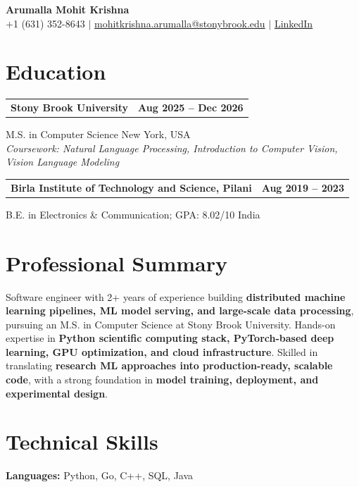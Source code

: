 \documentclass[letterpaper,10pt]{article}
\makeatletter
\newcommand{\entry}[2]{%
  \noindent
  \begin{tabularx}{\linewidth}
    {@{}>{\raggedright\arraybackslash}X@{\hspace{6pt}}r@{}}
    \textbf{#1} & #2
  \end{tabularx}\par
}
\makeatother
\begin{document}
\begin{center}
    {\LARGE\bfseries Arumalla Mohit Krishna}\\[3pt]
    +1 (631) 352-8643 $|$
    \href{mailto:mohitkrishna.arumalla@stonybrook.edu}
    {mohitkrishna.arumalla@stonybrook.edu} $|$
    \href{https://linkedin.com/in/mohit-krishna-arumalla}
    {LinkedIn}
\end{center}
\vspace{-8pt}

\section{Education}

\entry
  {Stony Brook University}
  {\textbf{Aug 2025 -- Dec 2026}}

M.S. in Computer Science \hfill New York, USA\\
\textit{
Coursework: Natural Language Processing,
Introduction to Computer Vision, Vision Language Modeling
}
\vspace{3pt}

\entry
  {Birla Institute of Technology and Science, Pilani}
  {\textbf{Aug 2019 -- 2023}}

B.E. in Electronics \& Communication; GPA: 8.02/10 \hfill India
\section{Professional Summary}

Software engineer with 2+ years of experience building \textbf{distributed machine learning pipelines, ML model serving, and large-scale data processing}, pursuing an M.S. in Computer Science at Stony Brook University. Hands-on expertise in \textbf{Python scientific computing stack, PyTorch-based deep learning, GPU optimization, and cloud infrastructure}. Skilled in translating \textbf{research ML approaches into production-ready, scalable code}, with a strong foundation in \textbf{model training, deployment, and experimental design}.

\section{Technical Skills}

\textbf{Languages:}
Python, Go, C++, SQL, Java\\
\end{document}
